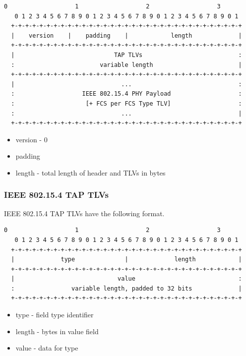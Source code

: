 \documentclass[12pt]{article}
\renewcommand\_{\textunderscore\allowbreak}
\begin{document}
\begin{Verbatim}[samepage=true]
   0                   1                   2                   3
   0 1 2 3 4 5 6 7 8 9 0 1 2 3 4 5 6 7 8 9 0 1 2 3 4 5 6 7 8 9 0 1
  +-+-+-+-+-+-+-+-+-+-+-+-+-+-+-+-+-+-+-+-+-+-+-+-+-+-+-+-+-+-+-+-+
  |    version    |    padding    |            length             |
  +-+-+-+-+-+-+-+-+-+-+-+-+-+-+-+-+-+-+-+-+-+-+-+-+-+-+-+-+-+-+-+-+
  |                            TAP TLVs                           :
  :                        variable length                        |
  +-+-+-+-+-+-+-+-+-+-+-+-+-+-+-+-+-+-+-+-+-+-+-+-+-+-+-+-+-+-+-+-+
  |                              ...                              :
  :                   IEEE 802.15.4 PHY Payload                   :
  :                    [+ FCS per FCS Type TLV]                   :
  :                              ...                              |
  +-+-+-+-+-+-+-+-+-+-+-+-+-+-+-+-+-+-+-+-+-+-+-+-+-+-+-+-+-+-+-+-+
\end{Verbatim}

\begin{itemize}
    \item version - 0
    \item padding
    \item length - total length of header and TLVs in bytes
\end{itemize}

\subsubsection{IEEE 802.15.4 TAP TLVs}

IEEE 802.15.4 TAP TLVs have the following format.

\begin{Verbatim}[samepage=true]
   0                   1                   2                   3
   0 1 2 3 4 5 6 7 8 9 0 1 2 3 4 5 6 7 8 9 0 1 2 3 4 5 6 7 8 9 0 1
  +-+-+-+-+-+-+-+-+-+-+-+-+-+-+-+-+-+-+-+-+-+-+-+-+-+-+-+-+-+-+-+-+
  |             type              |             length            |
  +-+-+-+-+-+-+-+-+-+-+-+-+-+-+-+-+-+-+-+-+-+-+-+-+-+-+-+-+-+-+-+-+
  |                             value                             :
  :                variable length, padded to 32 bits             |
  +-+-+-+-+-+-+-+-+-+-+-+-+-+-+-+-+-+-+-+-+-+-+-+-+-+-+-+-+-+-+-+-+
\end{Verbatim}

\begin{itemize}
    \item type        - field type identifier
    \item length      - bytes in value field
    \item value       - data for type
\end{itemize}
\end{document}
